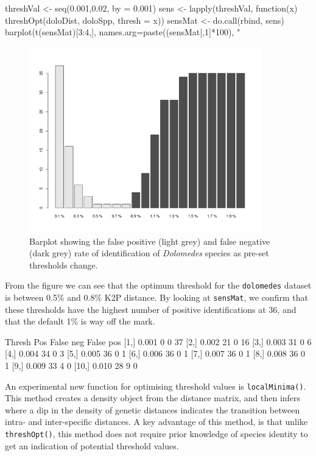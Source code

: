 \documentclass{article}
\newcommand{\fun}[1]{\texttt{#1}}
\begin{document}
\begin{console}
threshVal <- seq(0.001,0.02, by = 0.001)
sens <- lapply(threshVal, function(x) threshOpt(doloDist, doloSpp, thresh = x))
sensMat <- do.call(rbind, sens)
barplot(t(sensMat)[3:4,], names.arg=paste((sensMat[,1]*100), "%
\end{console}

\begin{figure}[p]
	\centering
	\includegraphics[width=0.9\textwidth,trim= 3cm 0cm 3cm 0cm]{sensitivity2}
	\caption{Barplot showing the false positive (light grey) and false negative (dark grey) rate of identification of \emph{Dolomedes} species as pre-set thresholds change.}
	\label{sensitivity.fig}
\end{figure}

From the figure we can see that the optimum threshold for the \fun{dolomedes} dataset is between 0.5\% and 0.8\% K2P distance. By looking at \fun{sensMat}, we confirm that these thresholds have the highest number of positive identifications at 36, and that the default 1\% is way off the mark.

\begin{Routput}
      Thresh Pos False neg False pos
 [1,]  0.001   0         0        37
 [2,]  0.002  21         0        16
 [3,]  0.003  31         0         6
 [4,]  0.004  34         0         3
 [5,]  0.005  36         0         1
 [6,]  0.006  36         0         1
 [7,]  0.007  36         0         1
 [8,]  0.008  36         0         1
 [9,]  0.009  33         4         0
[10,]  0.010  28         9         0
\end{Routput}

An experimental new function for optimising threshold values is \fun{localMinima()}. This method creates a density object from the distance matrix, and then infers where a dip in the density of genetic distances indicates the transition between intra- and inter-specific distances. A key advantage of this method, is that unlike \fun{threshOpt()}, this method does not require prior knowledge of species identity to get an indication of potential threshold values.
\end{document}
